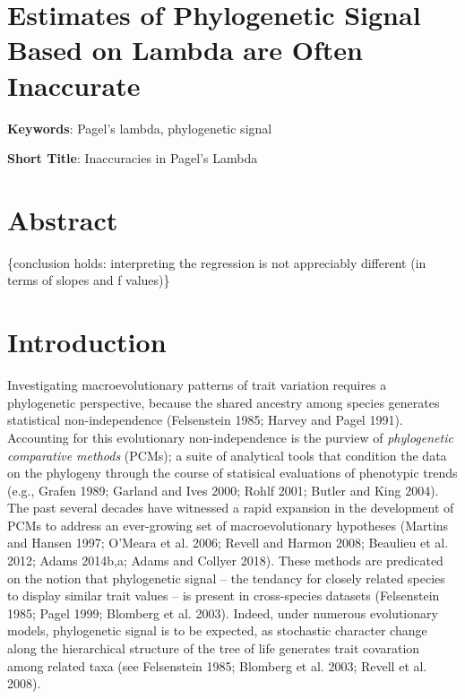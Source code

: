 \documentclass[
]{article}
\author{}
\date{\vspace{-2.5em}}
\begin{document}
\hypertarget{estimates-of-phylogenetic-signal-based-on-lambda-are-often-inaccurate}{%
\section{Estimates of Phylogenetic Signal Based on Lambda are Often
Inaccurate}\label{estimates-of-phylogenetic-signal-based-on-lambda-are-often-inaccurate}}

\hfill\break

\textbf{Keywords}: Pagel's lambda, phylogenetic signal \hfill\break

\textbf{Short Title}: Inaccuracies in Pagel's Lambda \hfill\break

\hypertarget{abstract}{%
\section{Abstract}\label{abstract}}

\{conclusion holds: interpreting the regression is not appreciably
different (in terms of slopes and f values)\}

\newpage

\hypertarget{introduction}{%
\section{Introduction}\label{introduction}}

Investigating macroevolutionary patterns of trait variation requires a
phylogenetic perspective, because the shared ancestry among species
generates statistical non-independence (Felsenstein 1985; Harvey and
Pagel 1991). Accounting for this evolutionary non-independence is the
purview of \emph{phylogenetic comparative methods} (PCMs); a suite of
analytical tools that condition the data on the phylogeny through the
course of statisical evaluations of phenotypic trends (e.g., Grafen
1989; Garland and Ives 2000; Rohlf 2001; Butler and King 2004). The past
several decades have witnessed a rapid expansion in the development of
PCMs to address an ever-growing set of macroevolutionary hypotheses
(Martins and Hansen 1997; O'Meara et al. 2006; Revell and Harmon 2008;
Beaulieu et al. 2012; Adams 2014b,a; Adams and Collyer 2018). These
methods are predicated on the notion that phylogenetic signal -- the
tendancy for closely related species to display similar trait values --
is present in cross-species datasets (Felsenstein 1985; Pagel 1999;
Blomberg et al. 2003). Indeed, under numerous evolutionary models,
phylogenetic signal is to be expected, as stochastic character change
along the hierarchical structure of the tree of life generates trait
covaration among related taxa (see Felsenstein 1985; Blomberg et al.
2003; Revell et al. 2008). \hfill\break
\end{document}
